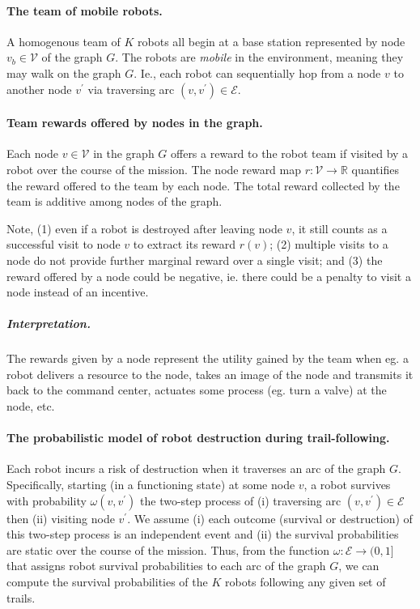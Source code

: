 \documentclass[11pt, oneside]{article}
\begin{document}
\paragraph{The team of mobile robots.}
A homogenous team of $K$ robots all begin at a base station represented by node $v_b \in \mathcal{V}$ of the graph $G$. The robots are \emph{mobile} in the environment, meaning they may walk on the graph $G$.
Ie., each robot can sequentially hop from a node $v$ to another node $v^\prime$ via traversing arc $(v, v^\prime)\in\mathcal{E}$.

\paragraph{Team rewards offered by nodes in the graph.}
Each node $v\in \mathcal{V}$ in the graph $G$ offers a reward to the robot team if visited by a robot over the course of the mission.
The node reward map $r: \mathcal{V} \rightarrow \mathbb{R}$ quantifies the reward offered to the team by each node. 
The total reward collected by the team is additive among nodes of the graph.
 
Note, 
(1) even if a robot is destroyed after leaving node $v$, it still counts as a successful visit to node $v$ to extract its reward $r(v)$;
(2) multiple visits to a node do not provide further marginal reward over a single visit; and
(3) the reward offered by a node could be negative, ie. there could be a penalty to visit a node instead of an incentive.

\vspace{-\baselineskip}
\subparagraph{Interpretation.} The rewards given by a node represent the utility gained by the team when eg. a robot delivers a resource to the node, takes an image of the node and transmits it back to the command center, actuates some process (eg. turn a valve) at the node, etc. 


\paragraph{The probabilistic model of robot destruction during trail-following.} 
Each robot incurs a risk of destruction when it traverses an arc of the graph $G$.
Specifically, starting (in a functioning state) at some node $v$, a robot survives with probability $\omega(v, v^\prime)$ the two-step process of (i) traversing arc $(v, v^\prime) \in \mathcal{E}$ then (ii) visiting node $v^\prime$. 
We assume (i) each outcome (survival or destruction) of this two-step process is an independent event and (ii) the survival probabilities are static over the course of the mission. 
Thus, from the function $\omega: \mathcal{E} \rightarrow (0, 1]$ that assigns robot survival probabilities to each arc of the graph $G$, we can compute the survival probabilities of the $K$ robots following any given set of trails.
\end{document}
